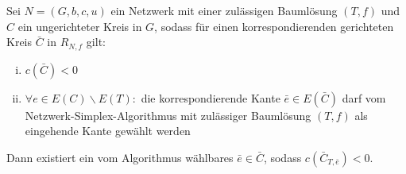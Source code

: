 \begin{lem}\label{iterierbar}Sei $N=(G,b,c,u)$ ein Netzwerk mit einer zulässigen Baumlösung $(T,f)$ und $C$ ein ungerichteter Kreis in $G$, sodass für einen korrespondierenden gerichteten Kreis $\bar{C}$ in $R_{N,f}$ gilt:
\begin{enumerate}[(i)]
	\item $c(\bar{C})<0$\label{negativ}
	\item $\forall e\in E(C)\backslash E(T) :$ die korrespondierende Kante $\bar{e}\in E(\bar{C})$ darf vom Netzwerk-Simplex-Algorithmus mit zulässiger Baumlösung $(T,f)$ als eingehende Kante gewählt werden\label{wählbar}
\end{enumerate}
Dann existiert ein vom Algorithmus wählbares $\bar{e}\in\bar{C}$, sodass $c(\bar{C}_{T,\bar{e}})<0$.
\end{lem}
